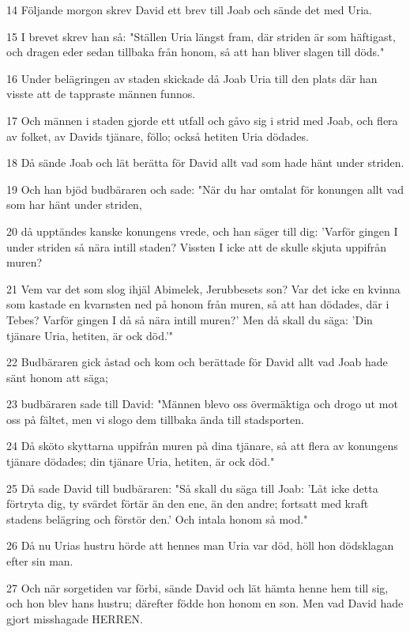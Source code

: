 \par 14 Följande morgon skrev David ett brev till Joab och sände det med Uria.
\par 15 I brevet skrev han så: "Ställen Uria längst fram, där striden är som häftigast, och dragen eder sedan tillbaka från honom, så att han bliver slagen till döds."
\par 16 Under belägringen av staden skickade då Joab Uria till den plats där han visste att de tappraste männen funnos.
\par 17 Och männen i staden gjorde ett utfall och gåvo sig i strid med Joab, och flera av folket, av Davids tjänare, föllo; också hetiten Uria dödades.
\par 18 Då sände Joab och lät berätta för David allt vad som hade hänt under striden.
\par 19 Och han bjöd budbäraren och sade: "När du har omtalat för konungen allt vad som har hänt under striden,
\par 20 då upptändes kanske konungens vrede, och han säger till dig: 'Varför gingen I under striden så nära intill staden? Vissten I icke att de skulle skjuta uppifrån muren?
\par 21 Vem var det som slog ihjäl Abimelek, Jerubbesets son? Var det icke en kvinna som kastade en kvarnsten ned på honom från muren, så att han dödades, där i Tebes? Varför gingen I då så nära intill muren?' Men då skall du säga: 'Din tjänare Uria, hetiten, är ock död.'"
\par 22 Budbäraren gick åstad och kom och berättade för David allt vad Joab hade sänt honom att säga;
\par 23 budbäraren sade till David: "Männen blevo oss övermäktiga och drogo ut mot oss på fältet, men vi slogo dem tillbaka ända till stadsporten.
\par 24 Då sköto skyttarna uppifrån muren på dina tjänare, så att flera av konungens tjänare dödades; din tjänare Uria, hetiten, är ock död."
\par 25 Då sade David till budbäraren: "Så skall du säga till Joab: 'Låt icke detta förtryta dig, ty svärdet förtär än den ene, än den andre; fortsatt med kraft stadens belägring och förstör den.' Och intala honom så mod."
\par 26 Då nu Urias hustru hörde att hennes man Uria var död, höll hon dödsklagan efter sin man.
\par 27 Och när sorgetiden var förbi, sände David och lät hämta henne hem till sig, och hon blev hans hustru; därefter födde hon honom en son. Men vad David hade gjort misshagade HERREN.

